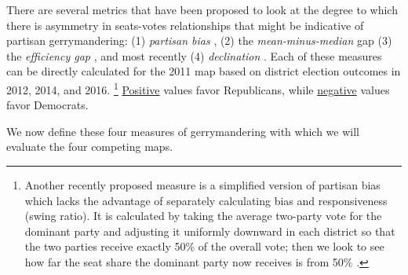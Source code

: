%
\par
    There are several metrics that have been proposed to look at the degree to which there is asymmetry in seats-votes relationships that might be indicative of partisan gerrymandering: (1) \textit{partisan bias} \citep{Tufte1973}, (2) the \textit{mean-minus-median} gap \citep{Mcdonald_Best_2015_ELJ} (3) the \textit{efficiency gap} \citep{Stephanopoulos2014_UofChicagoLaw}, and most recently (4) \textit{declination} \citep{Warrington2018}. Each of these measures can be directly calculated for the 2011 map based on district election outcomes in 2012, 2014, and 2016.
        \footnote{Another recently proposed measure is a simplified version of partisan bias which lacks the advantage of separately calculating bias and responsiveness (swing ratio). It is calculated by taking the average two-party vote for the dominant party and adjusting it uniformly downward in each district so that the two parties receive exactly 50\% of the overall vote; then we look to see how far the seat share the dominant party now receives is from 50\% \citep{Wang2016_SLR}.}
    \underline{Positive} values favor Republicans, while \underline{negative} values favor Democrats. 
\par
    We now define these four measures of gerrymandering with which we will evaluate the four competing maps.
%
